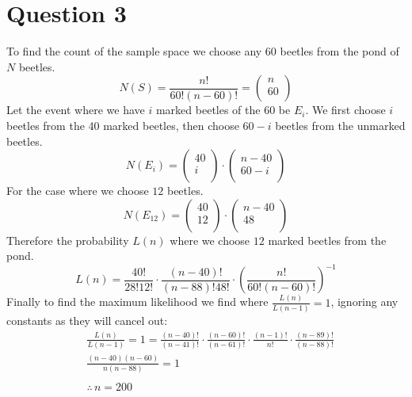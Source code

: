 \documentclass[12pt]{article}
\begin{document}
\section*{Question 3}
To find the count of the sample space we choose any \(60\) beetles from the pond of \(N\) beetles. 
\[
    N(S) = \frac{n!}{60!(n-60)!} = \begin{pmatrix}
         n \\
         60 \\
    \end{pmatrix}   
\]
Let the event where we have \(i\) marked beetles of the 60 be \(E_i\). We first choose \(i\) beetles from the 40 marked beetles, then choose \(60 - i\) beetles from the 
unmarked beetles. 
\[
    N(E_i) = \begin{pmatrix}
         40 \\
         i \\
    \end{pmatrix} \cdot  \begin{pmatrix}
         n - 40 \\
        60 - i  \\
    \end{pmatrix}
\]
For the case where we choose \(12\) beetles. 
\[
    N(E_{12} ) = \begin{pmatrix}
        40 \\
        12 \\
   \end{pmatrix} \cdot  \begin{pmatrix}
        n - 40 \\
       48  \\
   \end{pmatrix}
\]
Therefore the probability \(L(n)\) where we choose \(12\) marked beetles from the pond. 
\[
    L(n) = \frac{40!}{28!12!}\cdot  \frac{(n - 40)!}{(n - 88)!48!} \cdot  \left( \frac{n!}{60!(n-60)!} \right) ^{-1} 
\] 
Finally to find the maximum likelihood we find where \(\frac{L(n)}{L(n - 1)} = 1\), ignoring any constants as they will cancel out:
\begin{align*}
    &\frac{L(n)}{L(n - 1)} = 1 = \frac{(n - 40)!}{(n - 41)!} \cdot  \frac{(n  - 60)!}{(n - 61)!} \cdot  \frac{(n - 1)!}{n!} \cdot  \frac{(n - 89)!}{(n - 88)!} \\
    &\frac{(n - 40 )(n - 60)}{n ( n - 88)} = 1 \\ \\
    &\therefore \, n = 200
\end{align*}
\end{document}
